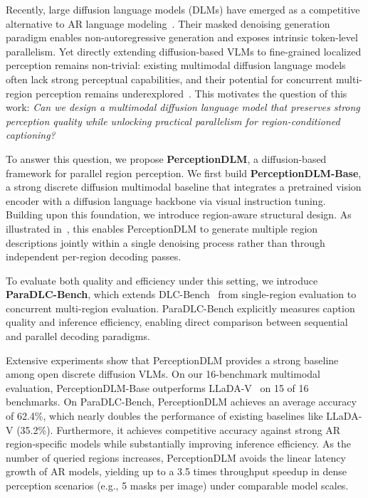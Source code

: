 Recently, large diffusion language models (DLMs) have emerged as a competitive alternative to AR language modeling~\citep{nielarge, you2025llada, ye2025dream, yangmmada}. Their masked denoising generation paradigm enables non-autoregressive generation and exposes intrinsic token-level parallelism. 
%
Yet directly extending diffusion-based VLMs to fine-grained localized perception remains non-trivial: existing multimodal diffusion language models often lack strong perceptual capabilities, and their potential for concurrent multi-region perception remains underexplored~\citep{you2025llada, cheng2025sdar, ye2025dream, yangmmada}. 
%
This motivates the question of this work: \textit{Can we design a multimodal diffusion language model that preserves strong perception quality while unlocking practical parallelism for region-conditioned captioning?}

To answer this question, we propose \textbf{PerceptionDLM}, a diffusion-based framework for parallel region perception. 
%
We first build \textbf{PerceptionDLM-Base}, a strong discrete diffusion multimodal baseline that integrates a pretrained vision encoder with a diffusion language backbone via visual instruction tuning. 
%
Building upon this foundation, we introduce region-aware structural design. As illustrated in~, this enables PerceptionDLM to generate multiple region descriptions jointly within a single denoising process rather than through independent per-region decoding passes.

To evaluate both quality and efficiency under this setting, we introduce \textbf{ParaDLC-Bench}, which extends DLC-Bench~\citep{lian2025describe} from single-region evaluation to concurrent multi-region evaluation. 
%
ParaDLC-Bench explicitly measures caption quality and inference efficiency, enabling direct comparison between sequential and parallel decoding paradigms. 
%

Extensive experiments show that PerceptionDLM provides a strong baseline among open discrete diffusion VLMs. On our 16-benchmark multimodal evaluation, PerceptionDLM-Base outperforms LLaDA-V~\citep{you2025llada} on 15 of 16 benchmarks. On ParaDLC-Bench, PerceptionDLM achieves an average accuracy of 62.4\%, which nearly doubles the performance of existing baselines like LLaDA-V (35.2\%).
%
Furthermore, it achieves competitive accuracy against strong AR region-specific models while substantially improving inference efficiency. As the number of queried regions increases, PerceptionDLM avoids the linear latency growth of AR models, yielding up to a 3.5 times throughput speedup in dense perception scenarios (e.g., 5 masks per image) under comparable model scales.

